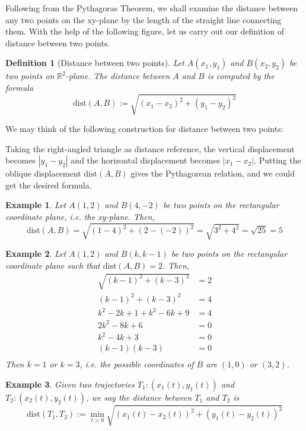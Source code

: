 \documentclass[12pt]{article}
\newtheorem{definition}{Definition}[section]
\newtheorem*{example}{Example}
\begin{document}
    Following from the Pythagoras Theorem, we shall examine the distance between any two points on the xy-plane by the length of the straight line connecting them. With the help of the following figure, let us carry out our definition of distance between two points.

    \begin{definition}[Distance between two points]
        Let $A(x_1,y_1)$ and $B(x_2,y_2)$ be two points on $\mathbb{R}^2$-plane. The distance between $A$ and $B$ is computed by the formula $$\mathrm{dist}(A,B):=\sqrt{(x_1-x_2)^2+(y_1-y_2)^2}$$
    \end{definition}

    We may think of the following construction for distance between two points:

    Taking the right-angled triangle as distance reference, the vertical displacement becomes $|y_1-y_2|$ and the horizontal displacement becomes $|x_1-x_2|$. Putting the oblique displacement $\mathrm{dist}(A,B)$ gives the Pythagorean relation, and we could get the desired formula.

    \begin{example}
        Let $A(1,2)$ and $B(4,-2)$ be two points on the rectangular coordinate plane, i.e. the xy-plane. Then, $$\mathrm{dist}(A,B)=\sqrt{(1-4)^2+(2-(-2))^2}=\sqrt{3^2+4^2}=\sqrt{25}=5$$
    \end{example}

    \begin{example}
        Let $A(1,2)$ and $B(k,k-1)$ be two points on the rectangular coordinate plane such that $\mathrm{dist}(A,B)=2$. Then, \begin{align*}
            \sqrt{(k-1)^2+(k-3)^2}&=2\\
            (k-1)^2+(k-3)^2&=4\\
            k^2-2k+1+k^2-6k+9&=4\\
            2k^2-8k+6&=0\\
            k^2-4k+3&=0\\
            (k-1)(k-3)&=0\\
        \end{align*}
        Then $k=1$ or $k=3$, i.e. the possible coordinates of $B$ are $(1,0)$ or $(3,2)$.
    \end{example}

    \begin{example}
        Given two trajectories $T_1:(x_1(t),y_1(t))$ and $T_2:(x_2(t),y_2(t))$, we say the distance between $T_1$ and $T_2$ is $$\mathrm{dist}(T_1,T_2):=\min_{t>0}\sqrt{(x_1(t)-x_2(t))^2+(y_1(t)-y_2(t))^2}$$
    \end{example}
\end{document}
